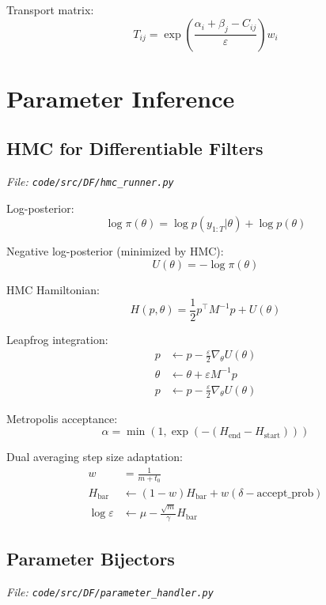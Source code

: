 \documentclass[12pt]{article}
\begin{document}
Transport matrix:
\begin{equation}
T_{ij} = \exp\left(\frac{\alpha_i + \beta_j - C_{ij}}{\varepsilon}\right) w_i
\end{equation}

\section{Parameter Inference}

\subsection{HMC for Differentiable Filters}
\textit{File: \texttt{code/src/DF/hmc\_runner.py}}

Log-posterior:
\begin{equation}
\log \pi(\theta) = \log p(y_{1:T} | \theta) + \log p(\theta)
\end{equation}

Negative log-posterior (minimized by HMC):
\begin{equation}
U(\theta) = -\log \pi(\theta)
\end{equation}

HMC Hamiltonian:
\begin{equation}
H(p, \theta) = \frac{1}{2} p^\top M^{-1} p + U(\theta)
\end{equation}

Leapfrog integration:
\begin{align}
p &\leftarrow p - \frac{\varepsilon}{2} \nabla_\theta U(\theta) \\
\theta &\leftarrow \theta + \varepsilon M^{-1} p \\
p &\leftarrow p - \frac{\varepsilon}{2} \nabla_\theta U(\theta)
\end{align}

Metropolis acceptance:
\begin{equation}
\alpha = \min(1, \exp(-(H_{\text{end}} - H_{\text{start}})))
\end{equation}

Dual averaging step size adaptation:
\begin{align}
w &= \frac{1}{m + t_0} \\
H_{\text{bar}} &\leftarrow (1-w) H_{\text{bar}} + w(\delta - \text{accept\_prob}) \\
\log \varepsilon &\leftarrow \mu - \frac{\sqrt{m}}{\gamma} H_{\text{bar}}
\end{align}

\subsection{Parameter Bijectors}
\textit{File: \texttt{code/src/DF/parameter\_handler.py}}
\end{document}
